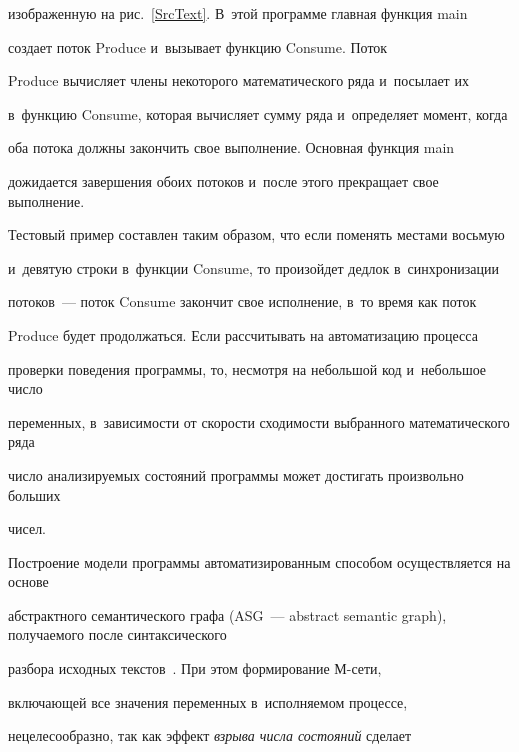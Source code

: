 изображенную на рис.~\ref{SrcText}. В~этой программе глав\-ная функция {\sf main} 


создает поток {\sf Produce} и~вызывает функцию {\sf Consume}. Поток 


{\sf Produce} вы\-чис\-ля\-ет члены некоторого математического ряда и~посылает их 


в~функ\-цию {\sf Consume}, которая вы\-чис\-ля\-ет сумму ряда и~определяет момент, когда 


оба потока долж\-ны закончить свое выполнение. Основная функция {\sf main} 


дожидается завершения обоих потоков и~после этого прекращает свое выполнение.











Тестовый пример составлен таким образом, что если поменять местами вось\-мую 


и~девятую строки в~функции {\sf Consume}, то произойдет дед\-лок в~синхронизации 


потоков~--- поток {\sf Consume} закончит свое исполнение, в~то время как поток 


{\sf Produce} будет продолжаться. Если рас\-счи\-ты\-вать на автоматизацию процесса 


проверки поведения программы, то, не\-смот\-ря на небольшой код и~небольшое чис\-ло 


переменных, в~за\-ви\-си\-мости от ско\-рости схо\-ди\-мости выбранного математического ряда 


чис\-ло ана\-ли\-зи\-ру\-емых со\-сто\-яний программы может до\-сти\-гать произвольно больших 


чисел.








Построение модели программы автоматизированным способом осуществляется на основе 


абстрактного семантического графа (ASG~--- abstract semantic graph), по\-лу\-ча\-емо\-го после синтаксического 


разбора исходных текс\-тов~\cite{Kharitonov:2011:MFC}. При этом формирование \mbox{М-се}\-ти, 


вклю\-ча\-ющей все значения переменных в~ис\-пол\-ня\-емом процессе, 


нецелесообразно, так как эффект \textit{взрыва числа состояний} сде\-лает 


